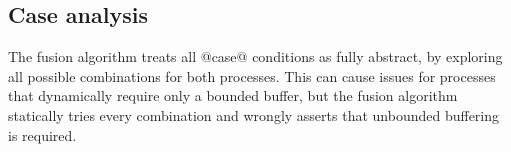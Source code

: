 % 
% 
% 
% 

\eject{}
\subsection{Case analysis}
\label{s:FullyAbstractCase}

The fusion algorithm treats all @case@ conditions as fully abstract, by exploring all possible combinations for both processes.
This can cause issues for processes that dynamically require only a bounded buffer, but the fusion algorithm statically tries every combination and wrongly asserts that unbounded buffering is required.


